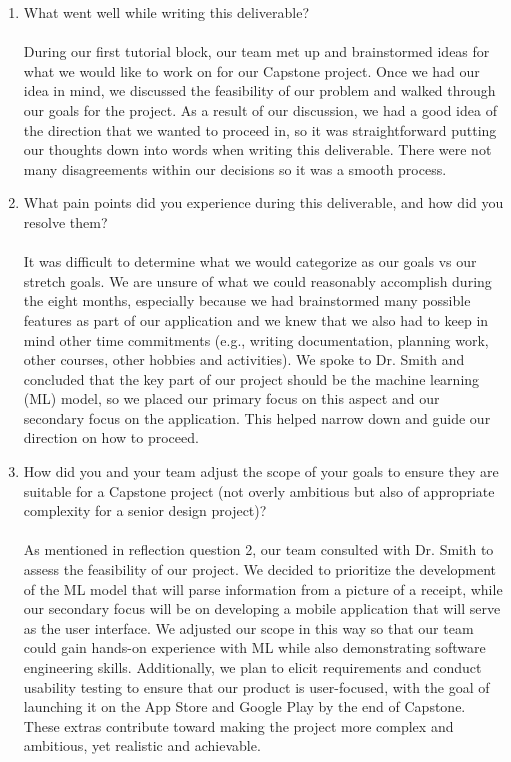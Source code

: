 \documentclass{article}
\begin{document}
\begin{enumerate}
    \item What went well while writing this deliverable? \\ \\
        During our first tutorial block, our team met up and brainstormed ideas for what we would like to work on for our Capstone project. Once we had our idea in mind, we discussed the feasibility of our problem and walked through our goals for the project. As a result of our discussion, we had a good idea of the direction that we wanted to proceed in, so it was straightforward putting our thoughts down into words when writing this deliverable. There were not many disagreements within our decisions so it was a smooth process.
    \item What pain points did you experience during this deliverable, and how
    did you resolve them? \\ \\
        It was difficult to determine what we would categorize as our goals vs our stretch goals. We are unsure of what we could reasonably accomplish during the eight months, especially because we had brainstormed many possible features as part of our application and we knew that we also had to keep in mind other time commitments (e.g., writing documentation, planning work, other courses, other hobbies and activities). We spoke to Dr. Smith and concluded that the key part of our project should be the machine learning (ML) model, so we placed our primary focus on this aspect and our secondary focus on the application. This helped narrow down and guide our direction on how to proceed.
    \item How did you and your team adjust the scope of your goals to ensure
    they are suitable for a Capstone project (not overly ambitious but also of
    appropriate complexity for a senior design project)? \\ \\ 
        As mentioned in reflection question 2, our team consulted with Dr. Smith to assess the feasibility of our project. We decided to prioritize the development of the ML model that will parse information from a picture of a receipt, while our secondary focus will be on developing a mobile application that will serve as the user interface. We adjusted our scope in this way so that our team could gain hands-on experience with ML while also demonstrating software engineering skills. Additionally, we plan to elicit requirements and conduct usability testing to ensure that our product is user-focused, with the goal of launching it on the App Store and Google Play by the end of Capstone. These extras contribute toward making the project more complex and ambitious, yet realistic and achievable. 
        
\end{enumerate}  
\end{document}
